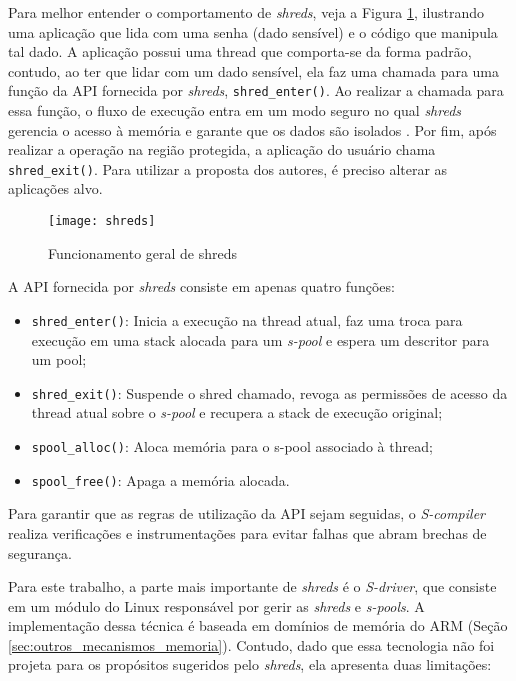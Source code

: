 Para melhor entender o comportamento de \emph{shreds}, veja a Figura
\ref{fig:shreds}, ilustrando uma aplicação que lida com uma senha (dado
sensível) e o código que manipula tal dado. A aplicação possui uma thread que
comporta-se da forma padrão, contudo, ao ter que lidar com um dado sensível, ela
faz uma chamada para uma função da API fornecida por \emph{shreds},
\texttt{shred\_enter()}. Ao realizar a chamada para essa função, o fluxo de
execução entra em um modo seguro no qual \emph{shreds} gerencia o acesso à
memória e garante que os dados são isolados . Por fim, após realizar
a operação na região protegida, a aplicação do usuário chama
\texttt{shred\_exit()}. Para utilizar a proposta dos autores, é preciso alterar
as aplicações alvo.

\begin{figure}[!h]
  \centering
  \texttt{[image: shreds]} 
  \caption{Funcionamento geral de shreds}
  \label{fig:shreds}
\end{figure}

A API fornecida por \emph{shreds} consiste em apenas quatro funções:

\begin{itemize}
  \item \texttt{shred\_enter()}: Inicia a execução na thread atual, faz uma
        troca para execução em uma stack alocada para um \textit{s-pool} e
        espera um descritor para um pool;
  \item \texttt{shred\_exit()}: Suspende o shred chamado, revoga as permissões
        de acesso da thread atual sobre o \textit{s-pool} e recupera a stack de execução
        original;
  \item \texttt{spool\_alloc()}: Aloca memória para o s-pool associado à
        thread;
  \item \texttt{spool\_free()}: Apaga a memória alocada.
\end{itemize}

Para garantir que as regras de utilização da API sejam seguidas, o
\emph{S-compiler} realiza verificações e instrumentações para evitar falhas que
abram brechas de segurança.

Para este trabalho, a parte mais importante de \emph{shreds} é o \emph{S-driver},
que consiste em um módulo do Linux responsável por gerir as \emph{shreds} e
\emph{s-pools}. A implementação dessa técnica é baseada em domínios de memória
do ARM (Seção \ref{sec:outros_mecanismos_memoria}). Contudo, dado que essa
tecnologia não foi projeta para os propósitos sugeridos pelo \emph{shreds}, ela
apresenta duas limitações:


